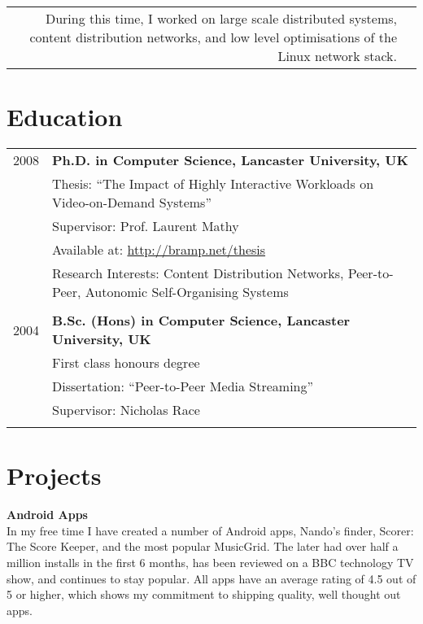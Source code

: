 \documentclass[letterpaper,10pt]{article}
\begin{document}
\begin{tabularx}{\textwidth}{r|X}
			During this time, I worked on large scale distributed systems, content distribution networks, and low level optimisations of the Linux
			network stack.
			\\


\end{tabularx}

\section{Education}
\begin{tabularx}{\textwidth}{rX}	
 \textsc{2008} & \textbf{Ph.D. in Computer Science, Lancaster University, UK}\\
& Thesis: ``The Impact of Highly Interactive Workloads on Video-on-Demand Systems''\\
& Supervisor: Prof. Laurent Mathy\\
& Available at: \href{http://bramp.net/thesis}{http://bramp.net/thesis}\\
& Research Interests: Content Distribution Networks, Peer-to-Peer, Autonomic Self-Organising Systems\\
&\\

\textsc{2004} & \textbf{B.Sc. (Hons) in Computer Science, Lancaster University, UK}\\
& First class honours degree\\
& Dissertation: ``Peer-to-Peer Media Streaming''\\
& Supervisor: Nicholas Race\\
&\\


\end{tabularx}
\clearpage
\section{Projects}

\textbf{Android Apps}\\
In my free time I have created a number of Android apps, Nando's finder, Scorer: The Score Keeper, and the most popular MusicGrid.
The later had over half a million installs in the first 6 months, has been reviewed on a BBC technology TV show, and continues
to stay popular. All apps have an average rating of 4.5 out of 5 or higher, which shows my commitment to shipping quality, well thought out apps.
\end{document}
